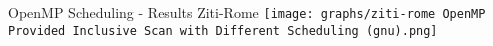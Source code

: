 \begin{frame}{OpenMP Scheduling - Results Ziti-Rome}
	\centering
	\vspace{-5pt}
	\texttt{[image: graphs/ziti-rome OpenMP Provided Inclusive Scan  with Different Scheduling (gnu).png]}
\end{frame}